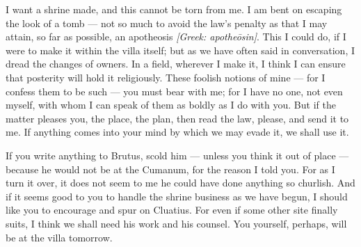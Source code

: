 

 I want a shrine made, and this cannot be torn from me. I am bent on escaping the look of a tomb --- not so much to avoid the law's penalty as that I may attain, so far as possible, an apotheosis \textit{[Greek: apothe\=osin]}. This I could do, if I were to make it within the villa itself; but as we have often said in conversation, I dread the changes of owners. In a field, wherever I make it, I think I can ensure that posterity will hold it religiously. These foolish notions of mine --- for I confess them to be such --- you must bear with me; for I have no one, not even myself, with whom I can speak of them as boldly as I do with you. But if the matter pleases you, the place, the plan, then read the law, please, and send it to me. If anything comes into your mind by which we may evade it, we shall use it.

 If you write anything to Brutus, scold him --- unless you think it out of place --- because he would not be at the Cumanum, for the reason I told you. For as I turn it over, it does not seem to me he could have done anything so churlish. And if it seems good to you to handle the shrine business as we have begun, I should like you to encourage and spur on Cluatius. For even if some other site finally suits, I think we shall need his work and his counsel. You yourself, perhaps, will be at the villa tomorrow.

